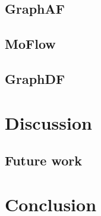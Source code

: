 \section{GraphAF}
\section{MoFlow}
\section{GraphDF}

\chapter{Discussion}
\label{c:dis}
\section{Future work}

\chapter{Conclusion}
\label{c:conclude}


\appendix





